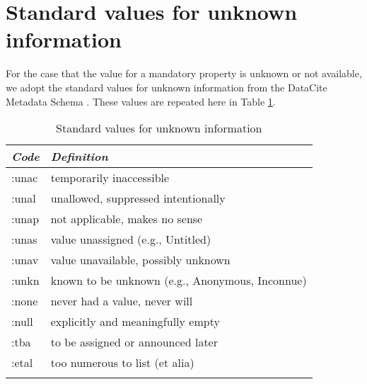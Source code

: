 \documentclass[titlepage=true,twoside=false,DIV=13]{scrartcl}
\begin{document}
\appendix

\section{Standard values for unknown information}
  \label{appendix:unknown}

For the case that the value for a mandatory property is unknown or not
available, we adopt the standard values for unknown information from
the DataCite Metadata Schema \cite{datacite:schema}.  These values are
repeated here in Table \ref{appendix:tab:unknown}.

\begin{longtable}{|l|l|}
  \hline
  \emph{Code} & \emph{Definition} \\
  \hline \endhead
  \hline \endfoot\endlastfoot
  :unac & temporarily inaccessible \\
  :unal & unallowed, suppressed intentionally \\
  :unap & not applicable, makes no sense \\
  :unas & value unassigned (e.g., Untitled) \\
  :unav & value unavailable, possibly unknown \\
  :unkn & known to be unknown (e.g., Anonymous, Inconnue) \\
  :none & never had a value, never will \\
  :null & explicitly and meaningfully empty \\
  :tba  & to be assigned or announced later \\
  :etal & too numerous to list (et alia) \\
  \hline
  \caption{Standard values for unknown information}
  \label{appendix:tab:unknown}
\end{longtable}



\end{document}
